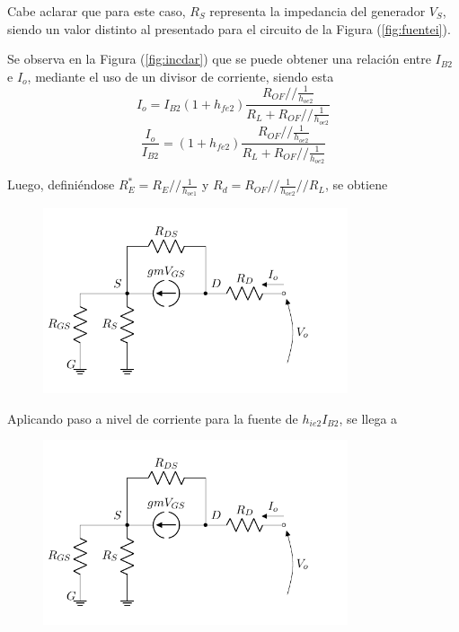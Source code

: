 Cabe aclarar que para este caso, $R_S$ representa la impedancia del generador $V_S$, siendo un valor distinto al presentado para el circuito de la Figura (\ref{fig:fuentei}).

Se observa en la Figura (\ref{fig:incdar}) que se puede obtener una relación entre $I_{B2}$ e $I_o$, mediante el uso de un divisor de corriente, siendo esta
\begin{equation*}
	I_o = I_{B2} \left( 1 + h_{fe2} \right) \frac{R_{OF} // \frac{1}{h_{oe2}}}{R_L + R_{OF} // \frac{1}{h_{oe2}}}
\end{equation*}
\begin{equation}
	\frac{I_o}{I_{B2}} = \left( 1 + h_{fe2} \right) \frac{R_{OF} // \frac{1}{h_{oe2}}}{R_L + R_{OF} // \frac{1}{h_{oe2}}}
	\label{equ:io-ib2}
\end{equation}

Luego, definiéndose $R_{E}^* = R_{E} // \frac{1}{h_{oe1}}$ y $R_d = R_{OF} // \frac{1}{h_{oe2}} // R_L$, se obtiene
\begin{figure}[H]
\centering
	\includegraphics[width=0.8\textwidth, page=4]{Imagenes/ModeloIncremental.pdf}
\end{figure}

Aplicando paso a nivel de corriente para la fuente de $h_{ie2} I_{B2}$, se llega a
\begin{figure}[H]
\centering
	\includegraphics[width=0.8\textwidth, page=5]{Imagenes/ModeloIncremental.pdf}
\end{figure}


